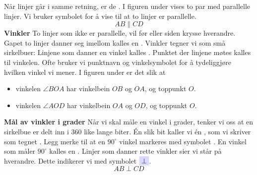 Når linjer går i samme retning, er de . I figuren under vises to par med parallelle linjer.
Vi bruker symbolet \sym{$ \parallel $} for å vise til at to linjer er parallelle.
\[ AB\parallel CD \]
\textbf{Vinkler} \label{vinklar}\os
To linjer som ikke er parallelle, vil før eller siden krysse hverandre. Gapet to linjer danner seg imellom kalles en . Vinkler tegner vi som små sirkelbuer:
Linjene som danner en vinkel kalles . Punktet der linjene møtes kalles  til vinkelen. Ofte bruker vi punktnavn og vinkelsymbolet \sym{$ \angle $} for å tydeliggjøre hvilken vinkel vi mener. I figuren under er det slik at
\begin{itemize}
\item vinkelen $ \angle BOA $  har vinkelbein $ OB $ og $ OA $, og toppunkt $ O $.
\item vinkelen $ \angle AOD $  har vinkelbein $ OA $ og $ OD $, og toppunkt $ O $.	
\end{itemize}
\newpage
\textbf{Mål av vinkler i grader}\os
Når vi skal måle en vinkel i grader, tenker vi oss at en sirkelbue er delt inn i 360 like lange biter. Én slik bit kaller vi én , som vi skriver som tegnet \sym{$ ^\circ $}. 
 \vsk
Legg merke til at en $ 90^\circ $ vinkel markeres med symbolet \sym{$ \square $}. En vinkel som måler $ 90^\circ $ kalles en . Linjer som danner rette vinkler sier vi står  på hverandre. Dette indikerer vi med symbolet $ \sym{$ \perp $} $.
\[ AB\perp CD \]
\newpage
{}\vsk
\label{vinkelend}
\newpage
{}

